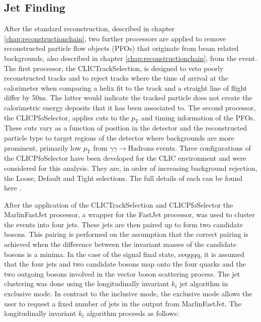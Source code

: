 
\subsection{Jet Finding} 
\label{sec:jetpairing}
After the standard reconstruction, described in chapter \ref{chap:reconstructionchain}, two further processors are applied to remove reconstructed particle flow objects (PFOs) that originate from beam related backgrounds, also described in chapter \ref{chap:reconstructionchain}, from the event.  The first processor, the CLICTrackSelection, is designed to veto poorly reconstructed tracks and to reject tracks where the time of arrival at the calorimeter when comparing a helix fit to the track and a straight line of flight differ by 50ns.  The latter would indicate the tracked particle does not create the calorimetric energy deposits that it has been associated to.  The second processor, the CLICPfoSelector, applies cuts to the $p_{\text{T}}$ and timing information of the PFOs.  These cuts vary as a function of position in the detector and the reconstructed particle type to target regions of the detector where backgrounds are more prominent, primarily low $p_{\text{T}}$ from $\gamma\gamma \rightarrow \text{Hadrons}$ events.  Three configurations of the CLICPfoSelector have been developed for the CLIC environment and were considered for this analysis.  They are, in order of increasing background rejection, the Loose, Default and Tight selections. The full details of each can be found here \cite{arXiv:1209.4039}.

After the application of the CLICTrackSelection and CLICPfoSelector the MarlinFastJet processor, a wrapper for the FastJet \cite{Cacciari:2011ma} processor, was used to cluster the events into four jets.  These jets are then paired up to form two candidate bosons.  This pairing is performed on the assumption that the correct pairing is achieved when the difference between the invariant masses of the candidate bosons is a minima.  In the case of the signal final state, $\nu\nu$qqqq, it is assumed that the four jets and two candidate bosons map onto the four quarks and the two outgoing bosons involved in the vector boson scattering process.  The jet clustering was done using the longitudinally invariant $k_{t}$ jet algorithm in exclusive mode.  In contrast to the inclusive mode, the exclusive mode allows the user to request a fixed number of jets in the output from MarlinFastJet.  The longitudinally invariant $k_{t}$ algorithm proceeds as follows:

